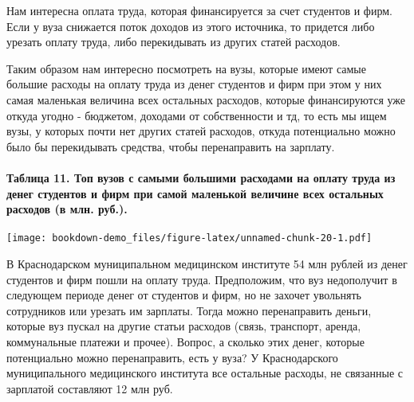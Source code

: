 \documentclass[]{book}
\let\oldparagraph\paragraph
\renewcommand{\paragraph}[1]{\oldparagraph{#1}\mbox{}}
\begin{document}
Нам интересна оплата труда, которая финансируется за счет студентов и фирм. Если у вуза снижается поток доходов из этого источника, то придется либо урезать оплату труда, либо перекидывать из других статей расходов.

Таким образом нам интересно посмотреть на вузы, которые имеют самые большие расходы на оплату труда из денег студентов и фирм при этом у них самая маленькая величина всех остальных расходов, которые финансируются уже откуда угодно - бюджетом, доходами от собственности и тд, то есть мы ищем вузы, у которых почти нет других статей расходов, откуда потенциально можно было бы перекидывать средства, чтобы перенаправить на зарплату.

\hypertarget{ux442ux430ux431ux43bux438ux446ux430-11.-ux442ux43eux43f-ux432ux443ux437ux43eux432-ux441-ux441ux430ux43cux44bux43cux438-ux431ux43eux43bux44cux448ux438ux43cux438-ux440ux430ux441ux445ux43eux434ux430ux43cux438-ux43dux430-ux43eux43fux43bux430ux442ux443-ux442ux440ux443ux434ux430-ux438ux437-ux434ux435ux43dux435ux433-ux441ux442ux443ux434ux435ux43dux442ux43eux432-ux438-ux444ux438ux440ux43c-ux43fux440ux438-ux441ux430ux43cux43eux439-ux43cux430ux43bux435ux43dux44cux43aux43eux439-ux432ux435ux43bux438ux447ux438ux43dux435-ux432ux441ux435ux445-ux43eux441ux442ux430ux43bux44cux43dux44bux445-ux440ux430ux441ux445ux43eux434ux43eux432-ux432-ux43cux43bux43d.-ux440ux443ux431..}{%
\paragraph{Таблица 11. Топ вузов с самыми большими расходами на оплату труда из денег студентов и фирм при самой маленькой величине всех остальных расходов (в млн. руб.).}\label{ux442ux430ux431ux43bux438ux446ux430-11.-ux442ux43eux43f-ux432ux443ux437ux43eux432-ux441-ux441ux430ux43cux44bux43cux438-ux431ux43eux43bux44cux448ux438ux43cux438-ux440ux430ux441ux445ux43eux434ux430ux43cux438-ux43dux430-ux43eux43fux43bux430ux442ux443-ux442ux440ux443ux434ux430-ux438ux437-ux434ux435ux43dux435ux433-ux441ux442ux443ux434ux435ux43dux442ux43eux432-ux438-ux444ux438ux440ux43c-ux43fux440ux438-ux441ux430ux43cux43eux439-ux43cux430ux43bux435ux43dux44cux43aux43eux439-ux432ux435ux43bux438ux447ux438ux43dux435-ux432ux441ux435ux445-ux43eux441ux442ux430ux43bux44cux43dux44bux445-ux440ux430ux441ux445ux43eux434ux43eux432-ux432-ux43cux43bux43d.-ux440ux443ux431..}}

\texttt{[image: bookdown-demo\_files/figure-latex/unnamed-chunk-20-1.pdf]}

В Краснодарском муниципальном медицинском институте 54 млн рублей из денег студентов и фирм пошли на оплату труда. Предположим, что вуз недополучит в следующем периоде денег от студентов и фирм, но не захочет увольнять сотрудников или урезать им зарплаты. Тогда можно перенаправить деньги, которые вуз пускал на другие статьи расходов (связь, транспорт, аренда, коммунальные платежи и прочее). Вопрос, а сколько этих денег, которые потенциально можно перенаправить, есть у вуза? У Краснодарского муниципального медицинского института все остальные расходы, не связанные с зарплатой составляют 12 млн руб.
\end{document}
